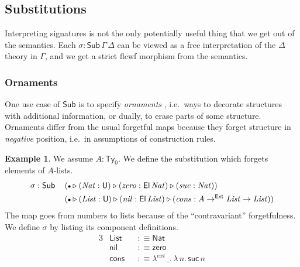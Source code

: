 \documentclass[12pt,a4paper,twoside,openany]{book}
\theoremstyle{remark}
\theoremstyle{definition}
\newtheorem{myexample}{Example}
\theoremstyle{theorem}
\newcommand{\mi}[1]{\mathit{#1}}
\newcommand{\ms}[1]{\mathsf{#1}}
\newcommand{\Sub}{\mathsf{Sub}}
\newcommand{\Ty}{\mathsf{Ty}}
\newcommand{\U}{\mathsf{U}}
\newcommand{\El}{\mathsf{El}}
\newcommand{\ext}{\triangleright}
\newcommand{\emptycon}{\scaleobj{.75}\bullet}
\newcommand{\toe}{\to^{\ms{Ext}}}
\newcommand{\defn}{:\equiv}
\begin{document}
\subsection{Substitutions}

Interpreting signatures is not the only potentially useful thing that we get out
of the semantics. Each $\sigma : \Sub\,\Gamma\,\Delta$ can be viewed as a free
interpretation of the $\Delta$ theory in $\Gamma$, and we get a strict flcwf
morphism from the semantics.

\subsubsection{Ornaments}

One use case of $\Sub$ is to specify \emph{ornaments} \cite{ornaments}, i.e.\ ways
to decorate structures with additional information, or dually, to erase parts of
some structure. Ornaments differ from the usual forgetful maps because they
forget structure in \emph{negative} position, i.e.\ in assumptions of
construction rules.

\begin{myexample}
We assume $A : \Ty_0$. We define the substitution which forgets elements of
$A$-lists.
\begin{alignat*}{3}
  & \sigma : \Sub\,&&
  (\emptycon \ext (\mi{Nat} : \U) \ext (\mi{zero} : \El\,\mi{Nat}) \ext (\mi{suc} : \mi{Nat}))\\
  & &&(\emptycon \ext (\mi{List} : \U) \ext (\mi{nil} : \El\,\mi{List}) \ext (\mi{cons} : A \toe \mi{List} \to \mi{List}))
\end{alignat*}
The map goes from numbers to lists because of the ``contravariant''
forgetfulness. We define $\sigma$ by listing its component definitions.
\begin{alignat*}{3}
  &\ms{List} &&\defn \ms{Nat}\\
  &\ms{nil} &&\defn \ms{zero}\\
  &\ms{cons} &&\defn \lambda^{ext}\,\_.\,\lambda\,n.\,\ms{suc}\,n
\end{alignat*}
\end{myexample}
\end{document}
